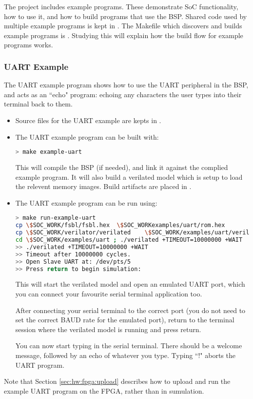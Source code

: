
%

The project includes example programs.
These demonstrate SoC functionality, how to use it, and how to
build programs that use the \SCARVSOC BSP.
Shared code used by multiple example programs is kept in
.
The Makefile which discovers and builds example programs is
.
Studying this will explain how the build flow for example programs
works.

\subsubsection{UART Example}

The UART example program shows how to use the UART peripheral in
the BSP, and acts as an ``echo" program: echoing any characters the
user types into their terminal back to them.

\begin{itemize}

\item Source files for the UART example are kepts in
    .

\item The UART example program can be built with:

\begin{lstlisting}[language=bash,style=block]
> make example-uart
\end{lstlisting}

    This will compile the BSP (if needed), and link it against the
    complied example program.
    It will also build a verilated model which is setup to load the
    relevent memory images.
    Build artifacts are placed in
    .

\item The UART example program can be run using:

\begin{lstlisting}[language=bash,style=block]
> make run-example-uart
cp \$SOC_WORK/fsbl/fsbl.hex  \$SOC_WORKexamples/uart/rom.hex
cp \$SOC_WORK/verilator/verilated    \$SOC_WORK/examples/uart/verilated
cd \$SOC_WORK/examples/uart ; ./verilated +TIMEOUT=10000000 +WAIT
>> ./verilated +TIMEOUT=10000000 +WAIT
>> Timeout after 10000000 cycles.
>> Open Slave UART at: /dev/pts/5
>> Press return to begin simulation:
\end{lstlisting}

    This will start the verilated model and open an emulated UART
    port, which you can connect your favourite serial terminal application
    too.

    After connecting your serial terminal to the correct port (you do
    not need to set the correct BAUD rate for the emulated port), return
    to the terminal session where the verilated model is running and
    press return.

    You can now start typing in the serial terminal.
    There should be a welcome message, followed by an echo of whatever
    you type.
    Typing ``!" aborts the UART program.

\end{itemize}

Note that Section \ref{sec:hw:fpga:upload} describes how to
upload and run the example UART program on the FPGA, rather than
in sumulation.

